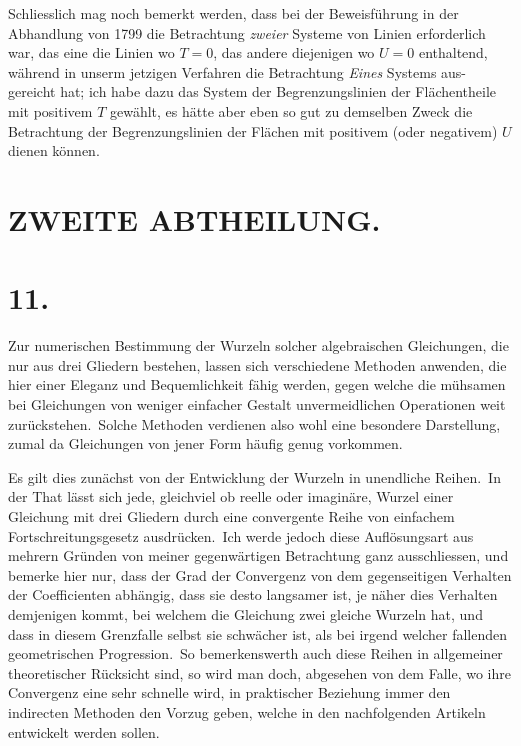 \documentclass[12pt,a4paper]{article}
\theoremstyle{plain}
\begin{document}
Schliesslich mag noch bemerkt werden, dass bei der Beweisführung in der
Abhandlung von 1799 die Betrachtung \textit{zweier} Systeme von Linien erforderlich
war, das eine die Linien wo $T = 0$, das andere diejenigen wo $U = 0$ enthaltend, während in unserm jetzigen Verfahren die Betrachtung \textit{Eines} Systems aus-
gereicht hat; ich habe dazu das System der Begrenzungslinien der Flächentheile
mit positivem $T$ gewählt, es hätte aber eben so gut zu demselben Zweck die Betrachtung der Begrenzungslinien der Flächen mit positivem (oder negativem) $U$
dienen können.

\section*{ZWEITE ABTHEILUNG.}

\section*{11.}

Zur numerischen Bestimmung der Wurzeln solcher algebraischen Gleichungen, die nur aus drei Gliedern bestehen, lassen sich verschiedene Methoden anwenden, die hier einer Eleganz und Bequemlichkeit fähig werden, gegen welche
die mühsamen bei Gleichungen von weniger einfacher Gestalt unvermeidlichen
Operationen weit zurückstehen.\ Solche Methoden verdienen also wohl eine besondere Darstellung, zumal da Gleichungen von jener Form häufig genug vorkommen.

Es gilt dies zunächst von der Entwicklung der Wurzeln in unendliche Reihen.\ In der That lässt sich jede, gleichviel ob reelle oder imaginäre, Wurzel einer Gleichung mit drei Gliedern durch eine convergente Reihe von einfachem
Fortschreitungsgesetz ausdrücken.\ Ich werde jedoch diese Auflösungsart aus mehrern Gründen von meiner gegenwärtigen Betrachtung ganz ausschliessen, und bemerke hier nur, dass der Grad der Convergenz von dem gegenseitigen Verhalten
der Coefficienten abhängig, dass sie desto langsamer ist, je näher dies Verhalten
demjenigen kommt, bei welchem die Gleichung zwei gleiche Wurzeln hat, und
dass in diesem Grenzfalle selbst sie schwächer ist, als bei irgend welcher fallenden
geometrischen Progression.\ So bemerkenswerth auch diese Reihen in allgemeiner
theoretischer Rücksicht sind, so wird man doch, abgesehen von dem Falle, wo
ihre Convergenz eine sehr schnelle wird, in praktischer Beziehung immer den indirecten Methoden den Vorzug geben, welche in den nachfolgenden Artikeln entwickelt werden sollen.
\end{document}
